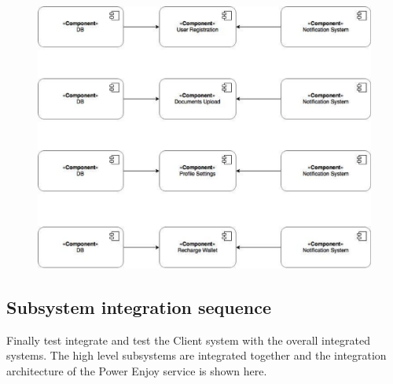 \begin{figure}[h]
	\centering
	\includegraphics[height=8.86cm,keepaspectratio]{figures/itp9.eps}
	\label{fig:itp9}
\end{figure}

\subsection{Subsystem integration sequence}
Finally test integrate and test the Client system with the overall integrated systems. The high level subsystems are integrated together and the integration architecture of the Power Enjoy service is shown here.

